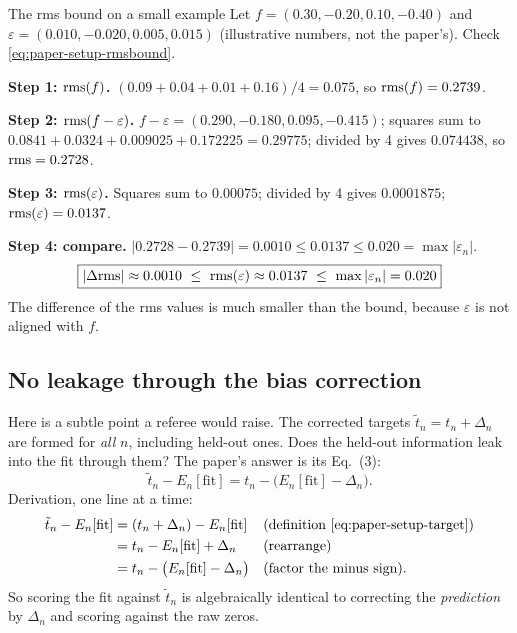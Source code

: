 \begin{sample}{The rms bound on a small example}
Let $f=(0.30,-0.20,0.10,-0.40)$ and $\varepsilon=(0.010,-0.020,0.005,0.015)$ (illustrative numbers, not the paper's). Check \eqref{eq:paper-setup-rmsbound}.

\textbf{Step 1: $\mathrm{rms}(f)$.} $(0.09+0.04+0.01+0.16)/4=0.075$, so $\mathrm{rms}(f)=0.2739$.

\textbf{Step 2: $\mathrm{rms}(f-\varepsilon)$.} $f-\varepsilon=(0.290,-0.180,0.095,-0.415)$; squares sum to $0.0841+0.0324+0.009025+0.172225=0.29775$; divided by 4 gives $0.074438$, so $\mathrm{rms}=0.2728$.

\textbf{Step 3: $\mathrm{rms}(\varepsilon)$.} Squares sum to $0.00075$; divided by 4 gives $0.0001875$; $\mathrm{rms}(\varepsilon)=0.0137$.

\textbf{Step 4: compare.} $|0.2728-0.2739|=0.0010\le0.0137\le0.020=\max|\varepsilon_n|$.
\[
\boxed{|\Delta\rms|\approx0.0010\ \le\ \rms(\varepsilon)\approx0.0137\ \le\ \max|\varepsilon_n|=0.020}
\]
The difference of the rms values is much smaller than the bound, because $\varepsilon$ is not aligned with $f$.
\end{sample}

\subsection{No leakage through the bias correction}

Here is a subtle point a referee would raise. The corrected targets $\tilde t_n=t_n+\Delta_n$ are formed for \emph{all} $n$, including held-out ones. Does the held-out information leak into the fit through them? The paper's answer is its Eq.~(3):
\begin{equation}
\tilde t_n-E_n[\text{fit}]=t_n-\bigl(E_n[\text{fit}]-\Delta_n\bigr).
\label{eq:paper-setup-leak}
\end{equation}
Derivation, one line at a time:
\begin{align}
\tilde t_n-E_n[\text{fit}]&=(t_n+\Delta_n)-E_n[\text{fit}] &&\text{(definition \eqref{eq:paper-setup-target})}\nonumber\\
&=t_n-E_n[\text{fit}]+\Delta_n &&\text{(rearrange)}\nonumber\\
&=t_n-\bigl(E_n[\text{fit}]-\Delta_n\bigr) &&\text{(factor the minus sign)}.\nonumber
\end{align}
So scoring the fit against $\tilde t_n$ is algebraically identical to correcting the \emph{prediction} by $\Delta_n$ and scoring against the raw zeros.

